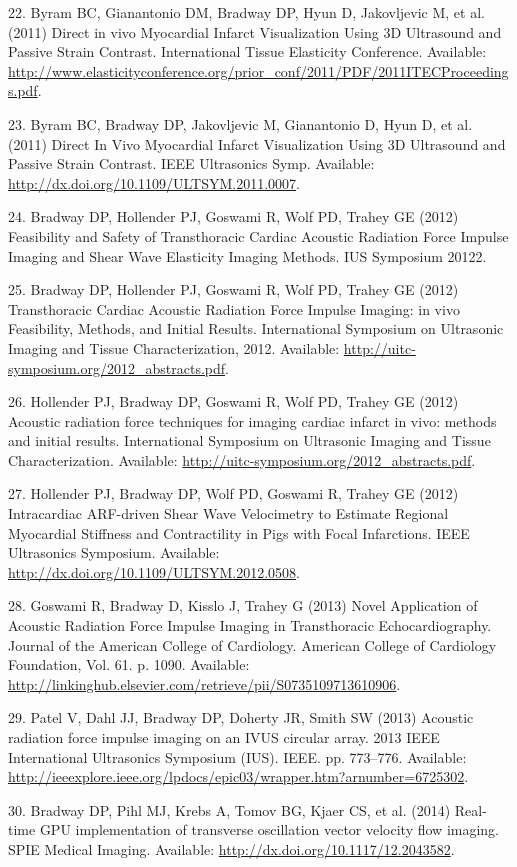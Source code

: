 \documentclass[]{article}
\begin{document}
22. Byram BC, Gianantonio DM, Bradway DP, Hyun D, Jakovljevic M, et al.
(2011) Direct in vivo Myocardial Infarct Visualization Using 3D
Ultrasound and Passive Strain Contrast. International Tissue Elasticity
Conference. Available:
\href{http://www.elasticityconference.org/prior\_conf/2011/PDF/2011ITECProceedings.pdf}{http://www.elasticityconference.org/prior\_conf/2011/PDF/2011ITECProceedings.pdf}.

23. Byram BC, Bradway DP, Jakovljevic M, Gianantonio D, Hyun D, et al.
(2011) Direct In Vivo Myocardial Infarct Visualization Using 3D
Ultrasound and Passive Strain Contrast. IEEE Ultrasonics Symp.
Available:
\href{http://dx.doi.org/10.1109/ULTSYM.2011.0007}{http://dx.doi.org/10.1109/ULTSYM.2011.0007}.

24. Bradway DP, Hollender PJ, Goswami R, Wolf PD, Trahey GE (2012)
Feasibility and Safety of Transthoracic Cardiac Acoustic Radiation Force
Impulse Imaging and Shear Wave Elasticity Imaging Methods. IUS Symposium
20122.

25. Bradway DP, Hollender PJ, Goswami R, Wolf PD, Trahey GE (2012)
Transthoracic Cardiac Acoustic Radiation Force Impulse Imaging: in vivo
Feasibility, Methods, and Initial Results. International Symposium on
Ultrasonic Imaging and Tissue Characterization, 2012. Available:
\href{http://uitc-symposium.org/2012\_abstracts.pdf}{http://uitc-symposium.org/2012\_abstracts.pdf}.

26. Hollender PJ, Bradway DP, Goswami R, Wolf PD, Trahey GE (2012)
Acoustic radiation force techniques for imaging cardiac infarct in vivo:
methods and initial results. International Symposium on Ultrasonic
Imaging and Tissue Characterization. Available:
\href{http://uitc-symposium.org/2012\_abstracts.pdf}{http://uitc-symposium.org/2012\_abstracts.pdf}.

27. Hollender PJ, Bradway DP, Wolf PD, Goswami R, Trahey GE (2012)
Intracardiac ARF-driven Shear Wave Velocimetry to Estimate Regional
Myocardial Stiffness and Contractility in Pigs with Focal Infarctions.
IEEE Ultrasonics Symposium. Available:
\href{http://dx.doi.org/10.1109/ULTSYM.2012.0508}{http://dx.doi.org/10.1109/ULTSYM.2012.0508}.

28. Goswami R, Bradway D, Kisslo J, Trahey G (2013) Novel Application of
Acoustic Radiation Force Impulse Imaging in Transthoracic
Echocardiography. Journal of the American College of Cardiology.
American College of Cardiology Foundation, Vol. 61. p. 1090. Available:
\href{http://linkinghub.elsevier.com/retrieve/pii/S0735109713610906}{http://linkinghub.elsevier.com/retrieve/pii/S0735109713610906}.

29. Patel V, Dahl JJ, Bradway DP, Doherty JR, Smith SW (2013) Acoustic
radiation force impulse imaging on an IVUS circular array. 2013 IEEE
International Ultrasonics Symposium (IUS). IEEE. pp. 773--776.
Available:
\href{http://ieeexplore.ieee.org/lpdocs/epic03/wrapper.htm?arnumber=6725302}{http://ieeexplore.ieee.org/lpdocs/epic03/wrapper.htm?arnumber=6725302}.

30. Bradway DP, Pihl MJ, Krebs A, Tomov BG, Kjaer CS, et al. (2014)
Real-time GPU implementation of transverse oscillation vector velocity
flow imaging. SPIE Medical Imaging. Available:
\href{http://dx.doi.org/10.1117/12.2043582}{http://dx.doi.org/10.1117/12.2043582}.
\end{document}
